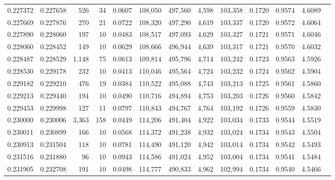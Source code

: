 \begin{tabular}{rrrrrrrrrrrrr}
0.227372 & 0.227658 &   526 &  34 &                                     0.0607 & 108,050 & 497,560 &   4,598 & 103,358 & 0.1720 & 0.9574 & 4.6089 \\
0.227669 & 0.227876 &   270 &  21 &                                     0.0722 & 108,320 & 497,290 &   4,619 & 103,337 & 0.1720 & 0.9572 & 4.6064 \\
0.227890 & 0.228060 &   197 &  10 &                                     0.0483 & 108,517 & 497,093 &   4,629 & 103,327 & 0.1721 & 0.9571 & 4.6046 \\
0.228060 & 0.228452 &   149 &  10 &                                     0.0629 & 108,666 & 496,944 &   4,639 & 103,317 & 0.1721 & 0.9570 & 4.6032 \\
0.228487 & 0.228529 & 1,148 &  75 &                                     0.0613 & 109,814 & 495,796 &   4,714 & 103,242 & 0.1723 & 0.9563 & 4.5926 \\
0.228530 & 0.229178 &   232 &  10 &                                     0.0413 & 110,046 & 495,564 &   4,724 & 103,232 & 0.1724 & 0.9562 & 4.5904 \\
0.229182 & 0.229210 &   476 &  19 &                                     0.0384 & 110,522 & 495,088 &   4,743 & 103,213 & 0.1725 & 0.9561 & 4.5860 \\
0.229213 & 0.229440 &   194 &  10 &                                     0.0490 & 110,716 & 494,894 &   4,753 & 103,203 & 0.1726 & 0.9560 & 4.5842 \\
0.229453 & 0.229998 &   127 &  11 &                                     0.0797 & 110,843 & 494,767 &   4,764 & 103,192 & 0.1726 & 0.9559 & 4.5830 \\
0.230000 & 0.230006 & 3,363 & 158 &                                     0.0449 & 114,206 & 491,404 &   4,922 & 103,034 & 0.1733 & 0.9544 & 4.5519 \\
0.230011 & 0.230899 &   166 &  10 &                                     0.0568 & 114,372 & 491,238 &   4,932 & 103,024 & 0.1734 & 0.9543 & 4.5504 \\
0.230913 & 0.231504 &   118 &  10 &                                     0.0781 & 114,490 & 491,120 &   4,942 & 103,014 & 0.1734 & 0.9542 & 4.5493 \\
0.231516 & 0.231880 &    96 &  10 &                                     0.0943 & 114,586 & 491,024 &   4,952 & 103,004 & 0.1734 & 0.9541 & 4.5484 \\
0.231905 & 0.232708 &   191 &  10 &                                     0.0498 & 114,777 & 490,833 &   4,962 & 102,994 & 0.1734 & 0.9540 & 4.5466 \\

\end{tabular}
